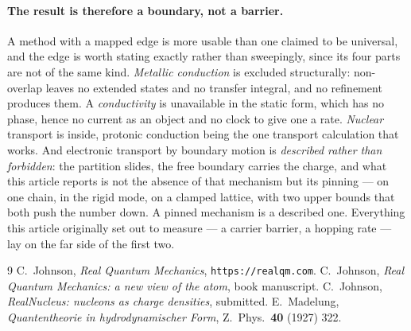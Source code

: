 \documentclass[11pt]{article}
\begin{document}
\paragraph{The result is therefore a boundary, not a barrier.} A method with a mapped edge is more
usable than one claimed to be universal, and the edge is worth stating exactly rather than
sweepingly, since its four parts are not of the same kind. \emph{Metallic conduction} is excluded
structurally: non-overlap leaves no extended states and no transfer integral, and no refinement
produces them. A \emph{conductivity} is unavailable in the static form, which has no phase, hence no
current as an object and no clock to give one a rate. \emph{Nuclear} transport is inside, protonic
conduction being the one transport calculation that works. And electronic transport by boundary
motion is \emph{described rather than forbidden}: the partition slides, the free boundary carries
the charge, and what this article reports is not the absence of that mechanism but its pinning ---
on one chain, in the rigid mode, on a clamped lattice, with two upper bounds that both push the
number down. A pinned mechanism is a described one. Everything this article originally set out to
measure --- a carrier barrier, a hopping rate --- lay on the far side of the first two.


\begin{thebibliography}{9}
 C.~Johnson, \emph{Real Quantum Mechanics}, \texttt{https://realqm.com}.
 C.~Johnson, \emph{Real Quantum Mechanics: a new view of the atom}, book
manuscript.
 C.~Johnson, \emph{RealNucleus: nucleons as charge densities}, submitted.
 E.~Madelung, \emph{Quantentheorie in hydrodynamischer Form},
Z.~Phys.~\textbf{40} (1927) 322.
\end{thebibliography}
\end{document}
